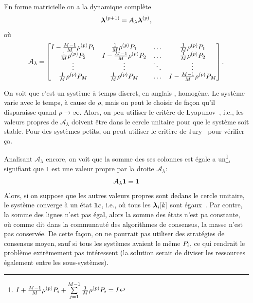 \documentclass[../main.tex]{subfiles}
\begin{document}
En forme matricielle on a la dynamique complète
\begin{equation}
  \label{eq:negotiation_equation_substituting_organizing_matrix_lambda_fr}
  \boldsymbol{\lambda}^{(p+1)}=\mathcal{A}_{\lambda}\boldsymbol{\lambda}^{(p)},
\end{equation}
où
\begin{equation}
\mathcal{A}_{\lambda}=\left[
\begin{matrix}
I-\frac{M-1}{M}\rho\p \Plin[1] & \frac{1}{M}\rho\p \Plin[1]&\dots&\frac{1}{M}\rho\p \Plin[1]\\
\frac{1}{M}\rho\p \Plin[2]&I-\frac{M-1}{M}\rho\p \Plin[2]&\dots&\frac{1}{M}\rho\p \Plin[2]\\
\vdots&\vdots&\ddots&\vdots\\
\frac{1}{M}\rho\p \Plin[M]&\frac{1}{M}\rho\p \Plin[M]&\dots&I-\frac{M-1}{M}\rho\p \Plin[M]\\
\end{matrix}
\right].
\end{equation}

On voit que c'est un système à temps discret, en anglais \dt{}, homogène.
Le système varie avec le temps, à cause de $\rho$, mais on peut le choisir de façon qu'il disparaisse quand $p\to\infty$.
Alors, on peu utiliser le critère de Lyapunov~\cite[\S8.6]{Hespanha2009}, i.e., les valeurs propres de $\mathcal{A}_{\lambda}$ doivent être dans le cercle unitaire pour que le système soit stable.
Pour des systèmes petits, on peut utiliser le critère de Jury~\cite{Jury1962} pour vérifier ça.

Analisant $\mathcal{A}_{\lambda}$ encore, on voit que la somme des ses colonnes est égale a un\footnote{$I+\frac{M-1}{M}\rho^{(p)} {P}_{i}+\sum\limits_{j=1}^{M-1}\frac{1}{M}\rho^{(p)} {P}_{i}=I$},
signifiant que $1$ est une valeur propre par la droite $\mathcal{A}_{\lambda}$:
\begin{equation*}
  \mathcal{A}_{\lambda}\mathbf{1}=\mathbf{1}
\end{equation*}
Alors, si on suppose que les autres valeurs propres sont dedans le cercle unitaire, le système converge à un état $\mathbf{1}c$, i.e., où tous les $\lambdaik$ sont égaux~\cite{GarinSchenato2010,XiaoEtAl2007}.
Par contre, la somme des lignes n'est pas égal, alors la somme des états n'est pa constante, où comme dit dans la communauté des algorithmes de consensus, la masse n'est pas conservée.
De cette façon, on ne pourrait pas utiliser des stratégies de consensus moyen, sauf si tous les systèmes avaient le même ${P}_{i}$, ce qui rendrait le problème extrêmement pas intéressent (la solution serait de diviser les ressources également entre les sous-systèmes).
\end{document}
